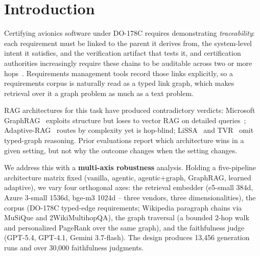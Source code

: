 \section{Introduction}
\label{sec:intro}

Certifying avionics software under DO-178C requires demonstrating
\emph{traceability}: each requirement must be linked to the parent it
derives from, the system-level intent it satisfies, and the
verification artifact that tests it, and certification authorities
increasingly require these chains to be auditable across two or more
hops~\cite{do178c,arp4754a,easa2025npa,faa2024airoadmap}. Requirements
management tools record those links explicitly, so a requirements
corpus is naturally read as a typed link graph, which makes retrieval
over it a graph problem as much as a text problem.

RAG architectures for this task have produced contradictory verdicts:
Microsoft GraphRAG~\cite{graphrag2024} exploits structure but loses to
vector RAG on detailed
queries~\cite{ragvsgraphrag2025,graphragbench2026};
Adaptive-RAG~\cite{adaptiverag2024} routes by
complexity yet is hop-blind; LiSSA~\cite{lissa2025} and
TVR~\cite{niu_tvr2025} omit typed-graph reasoning. Prior evaluations
report which architecture wins in a given setting, but not why the
outcome changes when the setting changes.

We address this with a \textbf{multi-axis robustness} analysis.
Holding a five-pipeline architecture matrix fixed (vanilla, agentic,
agentic+graph, GraphRAG, learned adaptive), we vary four orthogonal
axes: the retrieval embedder (e5-small 384d, Azure 3-small 1536d,
bge-m3 1024d -- three vendors, three dimensionalities), the corpus
(DO-178C typed-edge requirements; Wikipedia paragraph chains via
MuSiQue and 2WikiMultihopQA), the graph traversal (a bounded 2-hop walk
and personalized PageRank over the same graph), and the faithfulness
judge (GPT-5.4, GPT-4.1, Gemini 3.7-flash). The design produces 13{,}456
generation runs and over 30{,}000 faithfulness judgments.

